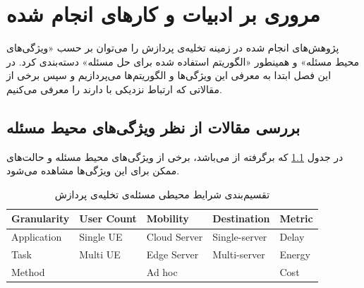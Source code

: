 \chapter{مروری بر ادبیات و کارهای انجام شده}
پژوهش‌های انجام شده در زمینه تخلیه‌ی پردازش را می‌توان بر حسب «ویژگی‌های محیط مسئله» و همینطور «الگوریتم استفاده شده برای حل مسئله» دسته‌بندی کرد. در این فصل ابتدا به معرفی این ویژگی‌ها و الگوریتم‌ها می‌پردازیم و سپس برخی از مقالاتی که ارتباط نزدیکی با \CurrentProject دارند را معرفی می‌کنیم.

\section[ویژگی‌های محیط مسئله]{بررسی مقالات از نظر ویژگی‌های محیط مسئله} 
در جدول \ref{table:mohit} که برگرفته از \cite{wang2019} می‌باشد، برخی از ویژگی‌های محیط مسئله و حالت‌های ممکن برای این ویژگی‌ها مشاهده می‌شود.
\begin{table}[H]
	\centering
	\begin{latin}

\begin{tabular}{@{}lllll@{}}
	\toprule
	\textbf{Granularity} & \textbf{User Count} & \textbf{Mobility} & \textbf{Destination} & \textbf{Metric} \\ \midrule
	Application          & Single UE             & Cloud Server      & Single-server        & Delay           \\
	Task                 & Multi UE   & Edge Server       & Multi-server         & Energy          \\
	Method               &             & Ad hoc            &                      & Cost            \\ \bottomrule
\end{tabular}
	\end{latin}
	\caption{تقسیم‌بندی شرایط محیطی مسئله‌ی تخلیه‌ی پردازش}
	\label{table:mohit}
\end{table}

